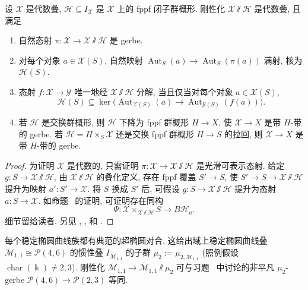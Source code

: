 \begin{proposition}\label{src:7.4.55}
设 $\mathcal X$ 是代数叠, $\mathcal H\subseteq I_{\mathcal X}$ 是 $\mathcal X$ 上的 fppf 闭子群概形. 刚性化 $\mathcal X\!\sslash\mathcal H$ 是代数叠, 且满足
\begin{enumerate}[(1)]
\item 自然态射 $\pi:\mathcal X\to\mathcal X\!\sslash\mathcal H$ 是 gerbe.
\item 对每个对象 $a\in\mathcal X(S)$, 自然映射 $\operatorname{Aut}_S(a)\to\operatorname{Aut}_S(\pi(a))$ 满射, 核为 $\mathcal H(S)$.
\item 态射 $f:\mathcal X\to\mathcal Y$ 唯一地经 $\mathcal X\!\sslash\mathcal H$ 分解, 当且仅当对每个对象 $a\in\mathcal X(S)$,
\[
\mathcal H(S)\subseteq\ker\bigl(\operatorname{Aut}_{\mathcal X(S)}(a)\to\operatorname{Aut}_{\mathcal Y(S)}(f(a))\bigr).
\]
\item 若 $\mathcal H$ 是交换群概形, 则 $\mathcal H$ 下降为 fppf 群概形 $H\to X$, 使 $\mathcal X\to X$ 是带 $H$-带的 gerbe. 若 $\mathcal H=H\times_S\mathcal X$ 还是交换 fppf 群概形 $H\to S$ 的拉回, 则 $\mathcal X\to X$ 是带 $H$-带的 gerbe.
\end{enumerate}
\end{proposition}
\begin{proof}
为证明 $\mathcal X$ 是代数的, 只需证明 $\pi:\mathcal X\to\mathcal X\!\sslash\mathcal H$ 是光滑可表示态射. 给定 $g:S\to\mathcal X\!\sslash\mathcal H$, 由 $\mathcal X\!\sslash\mathcal H$ 的叠化定义, 存在 fppf 覆盖 $S'\to S$, 使 $S'\to S\to\mathcal X\!\sslash\mathcal H$ 提升为映射 $a':S'\to\mathcal X$. 将 $S$ 换成 $S'$ 后, 可假设 $g:S\to\mathcal X\!\sslash\mathcal H$ 提升为态射 $a:S\to\mathcal X$. 如命题~ 的证明, 可证明存在同构
\[
\Psi:\mathcal X\times_{\mathcal X\sslash\mathcal H}S\longrightarrow B\mathcal H_a.
\]
细节留给读者. 另见 \cite[定理 5.1.5]{ACV03}, \cite[\S C]{AGV08}, \cite[\S5]{Rom05} 和 \cite[\S A]{AOV08}.
\end{proof}
\begin{example}\label{src:7.4.56}
每个稳定椭圆曲线族都有典范的超椭圆对合. 这给出域上稳定椭圆曲线叠 $\overline{\mathcal M}_{1,1}\cong\mathcal P(4,6)$ 的惯性叠 $I_{\overline{\mathcal M}_{1,1}}$ 的子群 $\mu_2:=\mu_{2,\overline{\mathcal M}_{1,1}}$ (照例假设 $\operatorname{char}(\Bbbk)\neq2,3$). 刚性化 $\overline{\mathcal M}_{1,1}\to\overline{\mathcal M}_{1,1}\!\sslash\mu_2$ 可与习题~ 中讨论的非平凡 $\mu_2$-gerbe $\mathcal P(4,6)\to\mathcal P(2,3)$ 等同.
\end{example}
